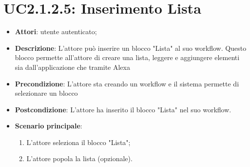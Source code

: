 \section{UC2.1.2.5: Inserimento Lista}
\label{UC2.1.2.5}
\begin{itemize}
	\item \textbf{Attori}: utente autenticato;
	\item \textbf{Descrizione}: L'attore può inserire un blocco "Lista" al suo workflow. Questo blocco permette all'attore di creare una lista, leggere e aggiungere elementi sia dall'applicazione che tramite Alexa
	\item \textbf{Precondizione}: L'attore sta creando un workflow e il sistema permette di selezionare un blocco
	\item \textbf{Postcondizione}: L'attore ha inserito il blocco "Lista" nel suo workflow.
	\item \textbf{Scenario principale}:
	\begin{enumerate} \item L'attore seleziona il blocco "Lista";  \item  L'attore popola la lista (opzionale).\end{enumerate}
\end{itemize}


